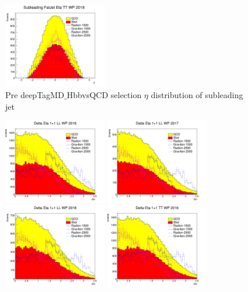 \begin{figure}[!htb]
	\includegraphics[width=0.4\textwidth]{Figures/eta1TT_18_deepTagMD_HbbvsQCD.png}
	\caption{Pre deepTagMD$\_$HbbvsQCD selection $\eta$ distribution of subleading jet}
	\label{fig:preEtasubBY}
\end{figure}
\begin{figure}[!htb]
	\centering
	\includegraphics[width=0.4\textwidth]{Figures/deltaEtaLL_16_deepTagMD_HbbvsQCD.png}
	\includegraphics[width=0.4\textwidth]{Figures/deltaEtaLL_17_deepTagMD_HbbvsQCD.png}
	\includegraphics[width=0.4\textwidth]{Figures/deltaEtaLL_18_deepTagMD_HbbvsQCD.png}
	\includegraphics[width=0.4\textwidth]{Figures/deltaEtaTT_16_deepTagMD_HbbvsQCD.png}

\end{figure}
